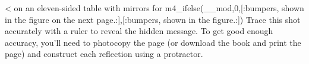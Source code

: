 <%
on an eleven-sided table with mirrors for 
m4_ifelse(__mod,0,[:bumpers, shown in the figure on the next page.:],[:bumpers, shown in the figure.:])
Trace this shot accurately with a ruler to reveal the hidden
message. To get good enough accuracy, you'll need to
photocopy the page (or download the book and print the page)
and construct each reflection using a protractor.
